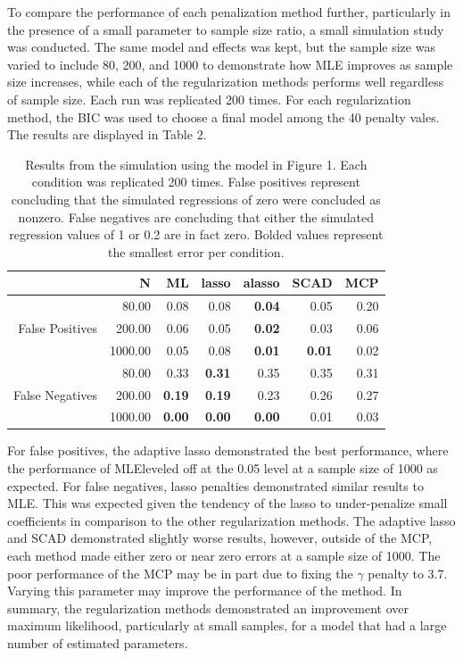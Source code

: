\documentclass[article]{jss}
\begin{document}
To compare the performance of each penalization method further,
particularly in the presence of a small parameter to sample size ratio,
a small simulation study was conducted. The same model and effects was
kept, but the sample size was varied to include 80, 200, and 1000 to
demonstrate how MLE improves as sample size increases, while each of the
regularization methods performs well regardless of sample size. Each run
was replicated 200 times. For each regularization method, the BIC was
used to choose a final model among the 40 penalty vales. The results are
displayed in Table 2.

\begin{table}[ht]
\centering
\begin{tabular}{rrrrrrr}
  \hline
 & N & ML & lasso & alasso & SCAD & MCP \\ 
  \hline
 & 80.00 & 0.08 & 0.08 & \textbf{0.04} & 0.05 & 0.20 \\ 
  False Positives & 200.00 & 0.06 & 0.05 & \textbf{0.02} & 0.03 & 0.06 \\ 
   & 1000.00 & 0.05 & 0.08 & \textbf{0.01} & \textbf{0.01} & 0.02 \\ 
   & 80.00 & 0.33 & \textbf{0.31} & 0.35 & 0.35 & 0.31 \\ 
  False Negatives & 200.00 & \textbf{0.19} & \textbf{0.19} & 0.23 & 0.26 & 0.27 \\ 
   & 1000.00 & \textbf{0.00} & \textbf{0.00} & \textbf{0.00} & 0.01 & 0.03 \\ 
   \hline
\end{tabular}
    \caption{Results from the simulation using the model in Figure 1. Each condition was replicated 200 times. False positives represent concluding that the simulated regressions of zero were concluded as nonzero. False negatives are concluding that either the simulated regression values of 1 or 0.2 are in fact zero. Bolded values represent the smallest error per condition.}
\end{table}

For false positives, the adaptive lasso demonstrated the best
performance, where the performance of MLEleveled off at the 0.05 level
at a sample size of 1000 as expected. For false negatives, lasso
penalties demonstrated similar results to MLE. This was expected given
the tendency of the lasso to under-penalize small coefficients in
comparison to the other regularization methods. The adaptive lasso and
SCAD demonstrated slightly worse results, however, outside of the MCP,
each method made either zero or near zero errors at a sample size of
1000. The poor performance of the MCP may be in part due to fixing the
\(\gamma\) penalty to 3.7. Varying this parameter may improve the
performance of the method. In summary, the regularization methods
demonstrated an improvement over maximum likelihood, particularly at
small samples, for a model that had a large number of estimated
parameters.
\end{document}
